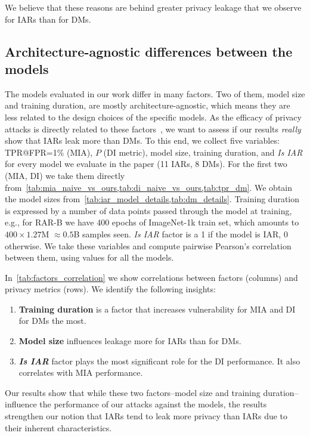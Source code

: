{We believe that these reasons are behind greater privacy leakage that we observe for IARs than for DMs.}

\subsection{Architecture-agnostic differences between the models}

{The models evaluated in our work differ in many factors. Two of them, model size and training duration, are mostly architecture-agnostic, which means they are less related to the design choices of the specific models. As the efficacy of privacy attacks is directly related to these factors~\citep{shokri2017membershipinference}, we want to assess if our results \textit{really} show that IARs leak more than DMs. To this end, we collect five variables: TPR@FPR=1\% (MIA), $P$ (DI metric), model size, training duration, and \textit{Is IAR} for every model we evaluate in the paper (11 IARs, 8 DMs). For the first two (MIA, DI) we take them directly from~\cref{tab:mia_naive_vs_ours,tab:di_naive_vs_ours,tab:tpr_dm}. We obtain the model sizes from~\cref{tab:iar_model_details,tab:dm_details}. Training duration is expressed by a number of data points passed through the model at training, e.g., for RAR-B we have 400 epochs of ImageNet-1k train set, which amounts to $400\times1.27$M $\approx0.5$B samples seen. \textit{Is IAR} factor is a 1 if the model is IAR, 0 otherwise. We take these variables and compute pairwise Pearson’s correlation between them, using values for all the models.}

{In~\cref{tab:factors_correlation} we show correlations between factors (columns) and privacy metrics (rows). We identify the following insights:
\begin{enumerate}
    \item \textbf{Training duration} is a factor that increases vulnerability for MIA and DI for DMs the most.
    \item \textbf{Model size} influences leakage more for IARs than for DMs.
    \item \textbf{\textit{Is IAR}} factor plays the most significant role for the DI performance. It also correlates with MIA performance.
\end{enumerate}
}

{Our results show that while these two factors--model size and training duration--influence the performance of our attacks against the models, the results strengthen our notion that IARs tend to leak more privacy than IARs due to their inherent characteristics.}

